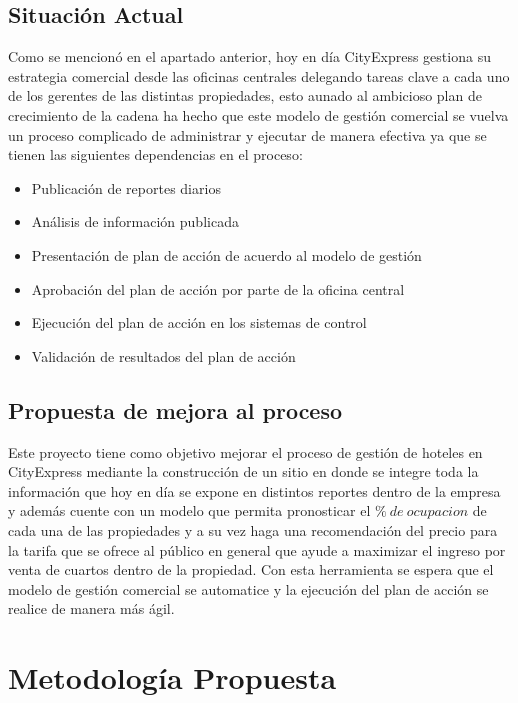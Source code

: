 \documentclass[a4paper,11pt]{article}
\begin{document}
\subsection{Situación Actual}
Como se mencionó en el apartado anterior, hoy en día CityExpress gestiona su estrategia comercial desde las oficinas centrales delegando tareas clave a cada uno de los gerentes de las distintas propiedades, esto aunado al ambicioso plan de crecimiento de la cadena ha hecho que este modelo de gestión comercial se vuelva un proceso complicado de administrar y ejecutar de manera efectiva ya que se tienen las siguientes dependencias en el proceso:
 \begin{itemize}[noitemsep]
\item Publicación de reportes diarios
\item Análisis de información publicada
\item Presentación de plan de acción de acuerdo al modelo de gestión
\item Aprobación del plan de acción por parte de la oficina central
\item Ejecución del plan de acción en los sistemas de control
\item Validación de resultados del plan de acción
\end{itemize}
\subsection{Propuesta de mejora al proceso}
Este proyecto tiene como objetivo mejorar el proceso de gestión de hoteles en CityExpress mediante la construcción de un sitio en donde se integre toda la información que hoy en día se expone en distintos reportes dentro de la empresa y además cuente con un modelo que permita pronosticar el $\%\ de\ ocupacion$ de cada una de las propiedades y a su vez haga una recomendación del precio para la tarifa que se ofrece al público en general que ayude a maximizar el ingreso por venta de cuartos dentro de la propiedad.
Con esta herramienta se espera que el modelo de gestión comercial se automatice y la ejecución del plan de acción se realice de manera más ágil.
\section{Metodología Propuesta}
\end{document}
